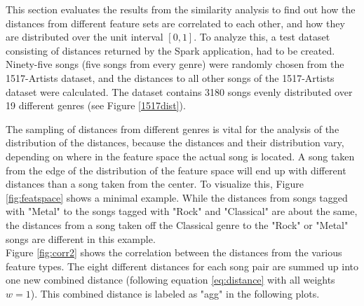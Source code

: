 This section evaluates the results from the similarity analysis to find out how the distances from different feature sets are correlated to each other, and how they are distributed over the unit interval $[0,1]$.
\noindent To analyze this, a test dataset consisting of distances returned by the Spark application, had to be created. Ninety-five songs (five songs from every genre) were randomly chosen from the 1517-Artists dataset, and the distances to all other songs of the 1517-Artists dataset were calculated. The dataset contains 3180 songs evenly distributed over 19 different genres (see Figure \ref{1517dist}).
\begin{figure}[htbp]
	\centering
\end{figure}%
\FloatBarrier

\noindent The sampling of distances from different genres is vital for the analysis of the distribution of the distances, because the distances and their distribution vary, depending on where in the feature space the actual song is located. 
\noindent A song taken from the edge of the distribution of the feature space will end up with different distances than a song taken from the center. To visualize this, Figure \ref{fig:featspace} shows a minimal example. While the distances from songs tagged with "Metal" to the songs tagged with "Rock" and "Classical" are about the same, the distances from a song taken off the Classical genre to the "Rock" or "Metal" songs are different in this example.\\ 
\noindent Figure \ref{fig:corr2} shows the correlation between the distances from the various feature types. The eight different distances for each song pair are summed up into one new combined distance (following equation \eqref{eq:distance} with all weights $w = 1$). This combined distance is labeled as "agg" in the following plots.

